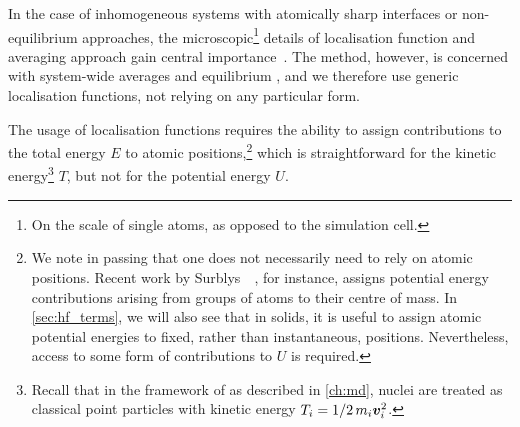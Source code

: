 In the case of inhomogeneous systems with atomically sharp interfaces or non-equilibrium approaches, the microscopic\footnote{On the scale of single atoms, as opposed to the simulation cell.} details of localisation function and averaging approach gain central importance~\cite{cd2016t}. The \gk method, however, is concerned with system-wide averages and equilibrium \md, and we therefore use generic localisation functions, not relying on any particular form.


The usage of localisation functions requires the ability to assign contributions to the total energy $E$ to atomic positions,\footnote[][-2\baselineskip]{We note in passing that one does not necessarily need to rely on atomic positions. Recent work by Surblys~\etal{}~\cite{smko2019t}, for instance, assigns potential energy contributions arising from groups of atoms to their centre of mass. In \cref{sec:hf_terms}, we will also see that in solids, it is useful to assign atomic potential energies to fixed, rather than instantaneous, positions. Nevertheless, access to some form of contributions to $U$ is required.} which is straightforward for the kinetic energy\footnote{Recall that in the framework of \md as described in \cref{ch:md}, nuclei are treated as classical point particles with kinetic energy $T_i = 1/2\, m_i \boldsymbol{v}_i^2$.} $T$, but not for the potential energy $U$.

